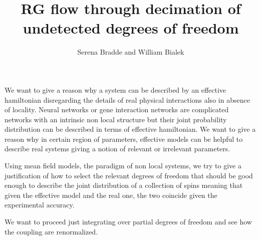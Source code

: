 \documentclass[aps,pre,noshowpacs]{revtex4}
\begin{document}
\title{RG flow through decimation of undetected degrees of freedom}

\author{Serena Bradde and William Bialek}
\maketitle
We want to give a reason why a system can be described by an effective hamiltonian
disregarding the details of real physical interactions also in absence of locality.
Neural networks or gene interaction networks are complicated networks
with an intrinsic non local structure but their joint probability distribution
can be described in terms of effective hamiltonian. 
We want to give a reason why in certain region of parameters, effective models can be
helpful to describe real systems giving a notion of relevant or irrelevant parameters.

Using mean field models, the paradigm of non local systems, we try to give a justification of 
how to select the relevant degrees
of freedom that should be good enough to describe the joint distribution of a collection of spins
meaning that given the effective model and the real one, the two coincide given the experimental accuracy.

We want to proceed just integrating over partial degrees of freedom and
see how the coupling are renormalized. 
\end{document}
